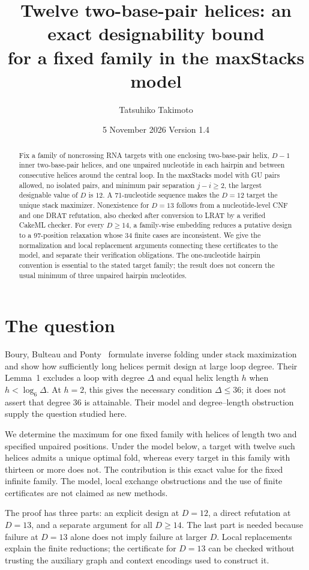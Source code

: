 \documentclass[11pt,a4paper]{article}
\title{Twelve two-base-pair helices: an exact designability bound\protect\\
for a fixed family in the maxStacks model}
\author{Tatsuhiko Takimoto}
\date{5 November 2026 \quad Version 1.4}
\theoremstyle{definition}
\begin{document}
\maketitle
\begin{abstract}
Fix a family of noncrossing RNA targets with one enclosing two-base-pair
helix, $D-1$ inner two-base-pair helices, and one unpaired nucleotide in
each hairpin and between consecutive helices around the central loop.
In the maxStacks model with GU pairs allowed, no isolated pairs, and
minimum pair separation $j-i\geq2$, the largest designable value of $D$
is $12$. A 71-nucleotide sequence makes the $D=12$ target the unique
stack maximizer. Nonexistence for $D=13$ follows from a nucleotide-level
CNF and one DRAT refutation, also checked after conversion to LRAT
by a verified CakeML checker. For every $D\geq14$, a family-wise embedding
reduces a putative design to a 97-position relaxation whose 34 finite
cases are inconsistent. We give the normalization and local replacement
arguments connecting these certificates to the model, and separate
their verification obligations. The one-nucleotide hairpin convention
is essential to the stated target family; the result does not concern
the usual minimum of three unpaired hairpin nucleotides.
\end{abstract}

\section{The question}
Boury, Bulteau and Ponty~\cite{BBP} formulate inverse folding under stack
maximization and show how sufficiently long helices permit design at
large loop degree. Their Lemma~1 excludes a loop with degree $\Delta$
and equal helix length $h$ when $h<\log_6\Delta$. At $h=2$, this gives
the necessary condition $\Delta\leq36$; it does not assert that degree
$36$ is attainable. Their model and degree--length
obstruction supply the question studied here.

We determine the maximum for one fixed family with helices of length
two and specified unpaired positions. Under the model below, a target
with twelve such helices admits a unique optimal fold, whereas every
target in this family with thirteen or more does not. The contribution
is this exact value for the fixed infinite family. The model, local
exchange obstructions and the use of finite certificates are not
claimed as new methods.

The proof has three parts: an explicit design at $D=12$, a direct
refutation at $D=13$, and a separate argument for all $D\geq14$.
The last part is needed because failure at $D=13$ alone does not imply
failure at larger $D$. Local replacements explain the finite reductions;
the certificate for $D=13$ can be checked without trusting the auxiliary
graph and context encodings used to construct it.
\end{document}
